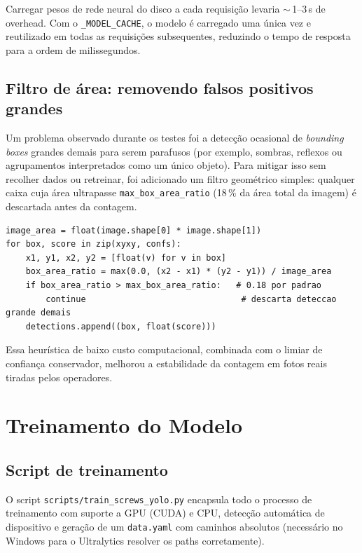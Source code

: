 \documentclass[12pt,a4paper]{article}
\begin{document}
Carregar pesos de rede neural do disco a cada requisi\c{c}\~ao levaria $\sim$\,1--3\,s
de overhead. Com o \texttt{\_MODEL\_CACHE}, o modelo \'e carregado uma \'unica vez e
reutilizado em todas as requisi\c{c}\~oes subsequentes, reduzindo o tempo de resposta
para a ordem de milissegundos.

\subsection{Filtro de \'area: removendo falsos positivos grandes}

Um problema observado durante os testes foi a detec\c{c}\~ao ocasional de
\emph{bounding boxes} grandes demais para serem parafusos (por exemplo, sombras,
reflexos ou agrupamentos interpretados como um \'unico objeto). Para mitigar isso sem
recolher dados ou retreinar, foi adicionado um filtro geom\'etrico simples: qualquer
caixa cuja \'area ultrapasse \texttt{max\_box\_area\_ratio} (18\,\% da \'area total da
imagem) \'e descartada antes da contagem.

\begin{lstlisting}[caption={Filtro de \'area por raz\~ao (\texttt{screw\_counter.py})}]
image_area = float(image.shape[0] * image.shape[1])
for box, score in zip(xyxy, confs):
    x1, y1, x2, y2 = [float(v) for v in box]
    box_area_ratio = max(0.0, (x2 - x1) * (y2 - y1)) / image_area
    if box_area_ratio > max_box_area_ratio:   # 0.18 por padrao
        continue                               # descarta deteccao grande demais
    detections.append((box, float(score)))
\end{lstlisting}

Essa heur\'istica de baixo custo computacional, combinada com o limiar de confian\c{c}a
conservador, melhorou a estabilidade da contagem em fotos reais tiradas pelos operadores.

\section{Treinamento do Modelo}

\subsection{Script de treinamento}

O script \texttt{scripts/train\_screws\_yolo.py} encapsula todo o processo de
treinamento com suporte a GPU (CUDA) e CPU, detec\c{c}\~ao autom\'atica de dispositivo
e gera\c{c}\~ao de um \texttt{data.yaml} com caminhos absolutos (necess\'ario no Windows
para o Ultralytics resolver os paths corretamente).
\end{document}
